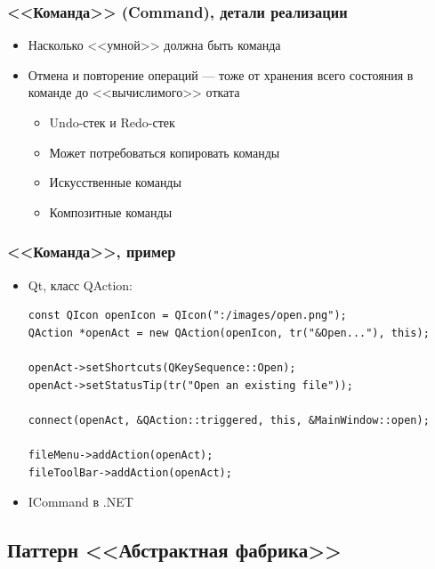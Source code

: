 \documentclass{../../slides-style}
\begin{document}
    \begin{frame}
        \frametitle{<<Команда>> (Command), детали реализации}
        \begin{itemize}
            \item Насколько <<умной>> должна быть команда
            \item Отмена и повторение операций --- тоже от хранения всего состояния в команде до <<вычислимого>> отката
            \begin{itemize}
                \item Undo-стек и Redo-стек
                \item Может потребоваться копировать команды
                \item Искусственные команды
                \item Композитные команды
            \end{itemize}
        \end{itemize}
    \end{frame}

    \begin{frame}[fragile]
        \frametitle{<<Команда>>, пример}
        \begin{itemize}
            \item Qt, класс QAction:
            \begin{verbatim}
const QIcon openIcon = QIcon(":/images/open.png");
QAction *openAct = new QAction(openIcon, tr("&Open..."), this);

openAct->setShortcuts(QKeySequence::Open);
openAct->setStatusTip(tr("Open an existing file"));

connect(openAct, &QAction::triggered, this, &MainWindow::open);

fileMenu->addAction(openAct);
fileToolBar->addAction(openAct);
            \end{verbatim}
            \item ICommand в .NET
        \end{itemize}
    \end{frame}

    \subsection{Паттерн <<Абстрактная фабрика>>}
\end{document}
